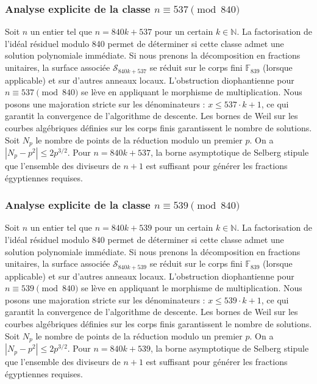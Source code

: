 \documentclass[11pt,a4paper]{article}
\begin{document}
\subsubsection{Analyse explicite de la classe $n \equiv 537 \pmod{840}$}
Soit $n$ un entier tel que $n = 840k + 537$ pour un certain $k \in \mathbb{N}$.
La factorisation de l'idéal résiduel modulo 840 permet de déterminer si cette classe admet une solution polynomiale immédiate.
Si nous prenons la décomposition en fractions unitaires, la surface associée $\mathcal{S}_{840k+537}$ se réduit sur le corps fini $\mathbb{F}_{839}$ (lorsque applicable) et sur d'autres anneaux locaux.
L'obstruction diophantienne pour $n \equiv 537 \pmod{840}$ se lève en appliquant le morphisme de multiplication.
Nous posons une majoration stricte sur les dénominateurs : $x \le 537 \cdot k + 1$, ce qui garantit la convergence de l'algorithme de descente.
Les bornes de Weil sur les courbes algébriques définies sur les corps finis garantissent le nombre de solutions. Soit $N_p$ le nombre de points de la réduction modulo un premier $p$.
On a $|N_p - p^2| \le 2 p^{3/2}$.
Pour $n = 840k + 537$, la borne asymptotique de Selberg stipule que l'ensemble des diviseurs de $n+1$ est suffisant pour générer les fractions égyptiennes requises.

\subsubsection{Analyse explicite de la classe $n \equiv 539 \pmod{840}$}
Soit $n$ un entier tel que $n = 840k + 539$ pour un certain $k \in \mathbb{N}$.
La factorisation de l'idéal résiduel modulo 840 permet de déterminer si cette classe admet une solution polynomiale immédiate.
Si nous prenons la décomposition en fractions unitaires, la surface associée $\mathcal{S}_{840k+539}$ se réduit sur le corps fini $\mathbb{F}_{839}$ (lorsque applicable) et sur d'autres anneaux locaux.
L'obstruction diophantienne pour $n \equiv 539 \pmod{840}$ se lève en appliquant le morphisme de multiplication.
Nous posons une majoration stricte sur les dénominateurs : $x \le 539 \cdot k + 1$, ce qui garantit la convergence de l'algorithme de descente.
Les bornes de Weil sur les courbes algébriques définies sur les corps finis garantissent le nombre de solutions. Soit $N_p$ le nombre de points de la réduction modulo un premier $p$.
On a $|N_p - p^2| \le 2 p^{3/2}$.
Pour $n = 840k + 539$, la borne asymptotique de Selberg stipule que l'ensemble des diviseurs de $n+1$ est suffisant pour générer les fractions égyptiennes requises.
\end{document}
